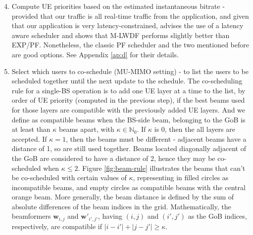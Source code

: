 \begin{enumerate} \setcounter{enumi}{3}
    \item Compute UE priorities based on the estimated instantaneous bitrate - provided that our traffic is all real-time traffic from the application, and given that our application is very latency-constrained, \cite{7020879} advises the use of a latency aware scheduler and shows that \ac{M-LWDF} performs slightly better than \ac{EXP/PF}. Nonetheless, the classic \ac{PF} scheduler and the two mentioned before are good options. See Appendix \ref{ap:d} for their details.

    \item Select which users to co-schedule (MU-MIMO setting) - to list the users to be scheduled together until the next update to the schedule. The co-scheduling rule for a single-BS operation is to add one UE layer at a time to the list, by order of \ac{UE} priority (computed in the previous step), if the best beams used for those layers are compatible with the previously added \ac{UE} layers. And we define as compatible beams when the BS-side beam, belonging to the \ac{GoB} is at least than $\kappa$ beams apart, with $\kappa \in \mathbb{N}_0$. If $\kappa$ is 0, then the all layers are accepted. If $\kappa = 1$, then the beams must be different - adjacent beams have a distance of 1, so are still used together. Beams located diagonally adjacent of the \ac{GoB} are considered to have a distance of 2, hence they may be co-scheduled when $\kappa \leq 2$. Figure \ref{fig:beam-rule} illustrates the beams that can't be co-scheduled with certain values of $\kappa$, representing in filled circles as incompatible beams, and empty circles as compatible beams with the central orange beam. More generally, the beam distance is defined by the sum of absolute differences of the beam indices in the grid. Mathematically, the beamformers $\bm{w}_{i,j}$ and $\bm{w}'_{i',j'}$, having $(i,j)$ and $(i', j')$ as the GoB indices, respectively, are compatible if $|i-i'| + |j - j'| \geq \kappa$.


\end{enumerate}
    

